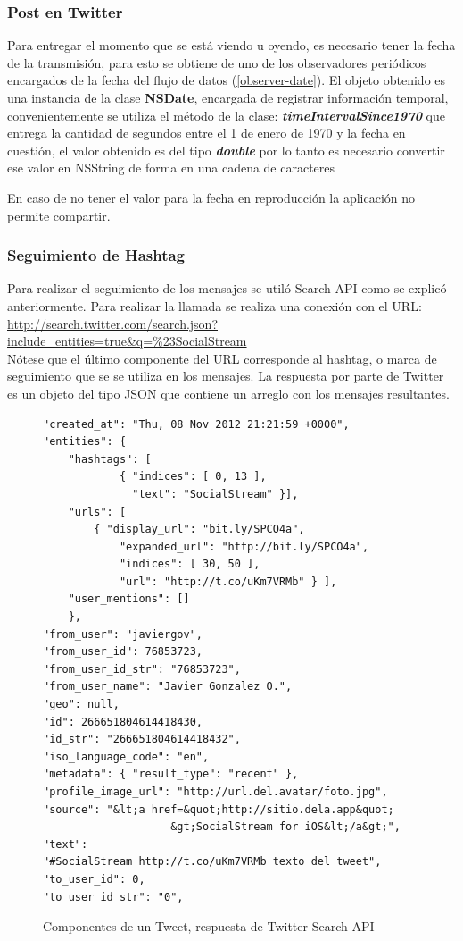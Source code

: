 		\subsubsection{Post en Twitter}
		Para entregar el momento que se está viendo u oyendo, es necesario tener la fecha de la transmisión, para esto se obtiene de uno de los observadores periódicos encargados de la fecha del flujo de datos (\ref{observer-date}). El objeto obtenido es una instancia de la clase \textbf{NSDate}, encargada de registrar información temporal, convenientemente se utiliza el método de la clase: \textit{\textbf{timeIntervalSince1970}} que entrega la cantidad de segundos entre el 1 de enero de 1970 y la fecha en cuestión, el valor obtenido es del tipo \textbf{\textit{double}} por lo tanto es necesario convertir ese valor en NSString de forma  en una cadena de caracteres
		
		
		En caso de no tener el valor para la fecha en reproducción la aplicación no permite compartir.

		\subsubsection{Seguimiento de Hashtag}
		Para realizar el seguimiento de los mensajes se utiló Search API como se explicó anteriormente. Para realizar la llamada se realiza una conexión con el URL: 
\url{http://search.twitter.com/search.json?include_entities=true&q=%23SocialStream} \\
		
		Nótese que el último componente del URL corresponde al hashtag, o marca de seguimiento que se se utiliza en los mensajes. La respuesta por parte de Twitter es un objeto del tipo JSON que contiene un arreglo con los mensajes resultantes.

\begin{figure}[H]
	\centering
	\begin{lstlisting}
"created_at": "Thu, 08 Nov 2012 21:21:59 +0000",
"entities": {
    "hashtags": [
    		{ "indices": [ 0, 13 ], 
    		  "text": "SocialStream" }],
    "urls": [
        { "display_url": "bit.ly/SPCO4a",
            "expanded_url": "http://bit.ly/SPCO4a",
            "indices": [ 30, 50 ],
            "url": "http://t.co/uKm7VRMb" } ],
    "user_mentions": [] 
    },
"from_user": "javiergov",
"from_user_id": 76853723,
"from_user_id_str": "76853723",
"from_user_name": "Javier Gonzalez O.",
"geo": null,
"id": 266651804614418430,
"id_str": "266651804614418432",
"iso_language_code": "en",
"metadata": { "result_type": "recent" },
"profile_image_url": "http://url.del.avatar/foto.jpg",
"source": "&lt;a href=&quot;http://sitio.dela.app&quot;
					&gt;SocialStream for iOS&lt;/a&gt;",
"text": 
"#SocialStream http://t.co/uKm7VRMb texto del tweet",
"to_user_id": 0,
"to_user_id_str": "0",
        	\end{lstlisting}
	\caption{Componentes de un Tweet, respuesta de Twitter Search API}
	\label{tweet-json}	
\end{figure}			

